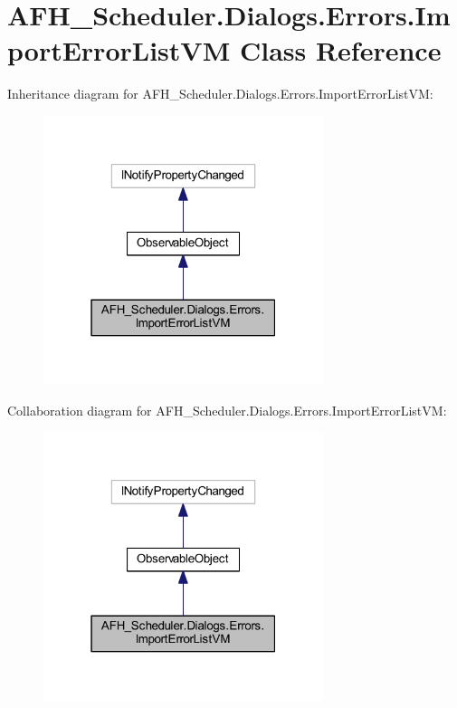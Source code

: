 \section{A\+F\+H\+\_\+\+Scheduler.\+Dialogs.\+Errors.\+Import\+Error\+List\+VM Class Reference}
\label{class_a_f_h___scheduler_1_1_dialogs_1_1_errors_1_1_import_error_list_v_m}


Inheritance diagram for A\+F\+H\+\_\+\+Scheduler.\+Dialogs.\+Errors.\+Import\+Error\+List\+VM\+:
\nopagebreak
\begin{figure}[H]
\begin{center}
\leavevmode
\includegraphics[width=232pt]{class_a_f_h___scheduler_1_1_dialogs_1_1_errors_1_1_import_error_list_v_m__inherit__graph}
\end{center}
\end{figure}


Collaboration diagram for A\+F\+H\+\_\+\+Scheduler.\+Dialogs.\+Errors.\+Import\+Error\+List\+VM\+:
\nopagebreak
\begin{figure}[H]
\begin{center}
\leavevmode
\includegraphics[width=232pt]{class_a_f_h___scheduler_1_1_dialogs_1_1_errors_1_1_import_error_list_v_m__coll__graph}
\end{center}
\end{figure}
